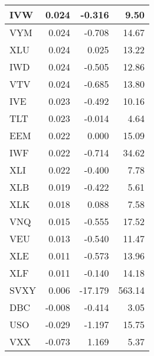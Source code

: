 \documentclass[10pt]{beamer}\usepackage[]{graphicx}\usepackage[]{color}
\newenvironment{knitrout}{}{} %
\begin{document}
\begin{frame}[fragile,t]{\subsecname}
\begin{block}{}
\begin{columns}[T]
\begin{knitrout}
\begin{tabular}{l|r|r|r}
\hline
IVW & 0.024 & -0.316 & 9.50\\
\hline
VYM & 0.024 & -0.708 & 14.67\\
\hline
XLU & 0.024 & 0.025 & 13.22\\
\hline
IWD & 0.024 & -0.505 & 12.86\\
\hline
VTV & 0.024 & -0.685 & 13.80\\
\hline
IVE & 0.023 & -0.492 & 10.16\\
\hline
TLT & 0.023 & -0.014 & 4.64\\
\hline
EEM & 0.022 & 0.000 & 15.09\\
\hline
IWF & 0.022 & -0.714 & 34.62\\
\hline
XLI & 0.022 & -0.400 & 7.78\\
\hline
XLB & 0.019 & -0.422 & 5.61\\
\hline
XLK & 0.018 & 0.088 & 7.58\\
\hline
VNQ & 0.015 & -0.555 & 17.52\\
\hline
VEU & 0.013 & -0.540 & 11.47\\
\hline
XLE & 0.011 & -0.573 & 13.96\\
\hline
XLF & 0.011 & -0.140 & 14.18\\
\hline
SVXY & 0.006 & -17.179 & 563.14\\
\hline
DBC & -0.008 & -0.414 & 3.05\\
\hline
USO & -0.029 & -1.197 & 15.75\\
\hline
VXX & -0.073 & 1.169 & 5.37\\
\hline
\end{tabular}

\end{knitrout}
  \end{columns}
\end{block}

\end{frame}


\end{document}
